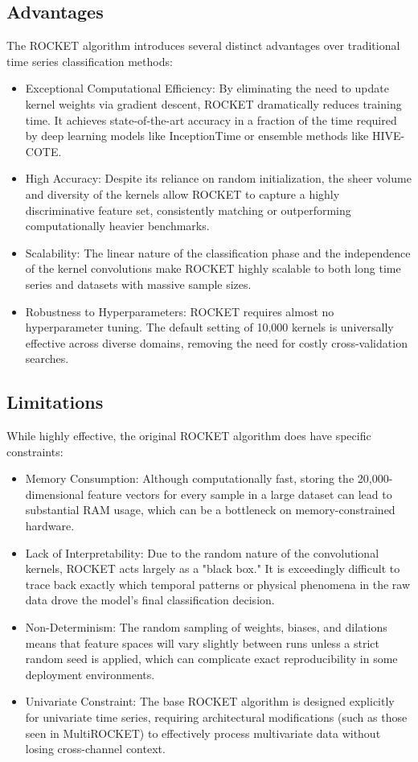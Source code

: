 \subsection{Advantages}
The ROCKET algorithm introduces several distinct advantages over traditional time series classification methods:

\begin{itemize}
    \item Exceptional Computational Efficiency: By eliminating the need to update kernel weights via gradient descent, ROCKET dramatically reduces training time. It achieves state-of-the-art accuracy in a fraction of the time required by deep learning models like InceptionTime or ensemble methods like HIVE-COTE.
    \item High Accuracy: Despite its reliance on random initialization, the sheer volume and diversity of the kernels allow ROCKET to capture a highly discriminative feature set, consistently matching or outperforming computationally heavier benchmarks.
    \item Scalability: The linear nature of the classification phase and the independence of the kernel convolutions make ROCKET highly scalable to both long time series and datasets with massive sample sizes.
    \item Robustness to Hyperparameters: ROCKET requires almost no hyperparameter tuning. The default setting of 10,000 kernels is universally effective across diverse domains, removing the need for costly cross-validation searches.
\end{itemize}

\subsection{Limitations}
While highly effective, the original ROCKET algorithm does have specific constraints:

\begin{itemize}
    \item Memory Consumption: Although computationally fast, storing the 20,000-dimensional feature vectors for every sample in a large dataset can lead to substantial RAM usage, which can be a bottleneck on memory-constrained hardware.
    \item Lack of Interpretability: Due to the random nature of the convolutional kernels, ROCKET acts largely as a "black box." It is exceedingly difficult to trace back exactly which temporal patterns or physical phenomena in the raw data drove the model's final classification decision.
    \item Non-Determinism: The random sampling of weights, biases, and dilations means that feature spaces will vary slightly between runs unless a strict random seed is applied, which can complicate exact reproducibility in some deployment environments.
    \item Univariate Constraint: The base ROCKET algorithm is designed explicitly for univariate time series, requiring architectural modifications (such as those seen in MultiROCKET) to effectively process multivariate data without losing cross-channel context.
\end{itemize}
